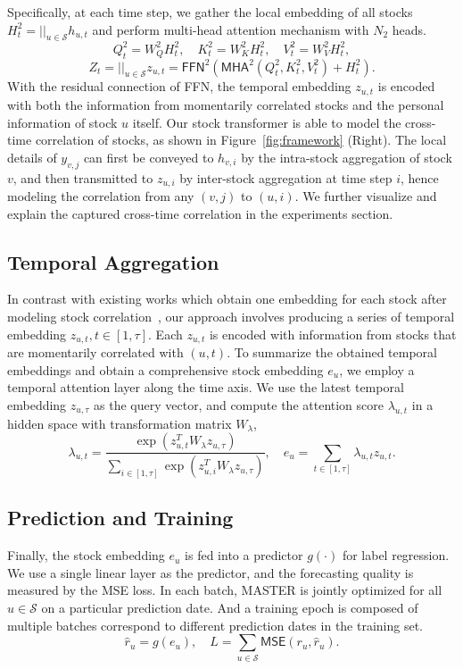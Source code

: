 Specifically, at each time step, we gather the local embedding of all stocks $H^2_t=||_{u\in\mathcal{S}} h_{u,t}$ and perform multi-head attention mechanism with $N_2$ heads. 
$$Q^2_t = W^2_QH^2_t,\quad K^2_t=W^2_KH^2_t, \quad V^2_t=W^2_VH^2_t,$$
$$ Z_t=||_{u\in\mathcal{S}} z_{u,t} =\textsf{FFN}^2(\textsf{MHA}^2(Q^2_t,K^2_t,V^2_t)+H^2_t).$$
With the residual connection of \textsf{FFN}, the temporal embedding $z_{u,t}$ is encoded with both the information from momentarily correlated stocks and the personal information of stock $u$ itself. 
Our stock transformer is able to model the cross-time correlation of stocks, as shown in Figure~\ref{fig:framework} (Right). The local details of $y_{v,j}$ can first be conveyed to $h_{v,i}$ by the intra-stock aggregation of stock $v$, and then transmitted to $z_{u,i}$ by inter-stock aggregation at time step $i$, hence modeling the correlation from any $(v,j)$ to $(u,i)$. 
We further visualize and explain the captured cross-time correlation in the experiments section.

\subsection{Temporal Aggregation}
In contrast with existing works which obtain one embedding for each stock after modeling stock correlation~\cite{feng2019temporal}, our approach involves producing a series of temporal embedding $z_{u,t}, t\in[1,\tau].$ 
Each $z_{u,t}$ is encoded with information from stocks that are momentarily correlated with $(u,t)$.
To summarize the obtained temporal embeddings and obtain a comprehensive stock embedding $e_u$, we employ a temporal attention layer along the time axis. 
We use the latest temporal embedding $z_{u,\tau}$ as the query vector, and compute the attention score $\lambda_{u,t}$ in a hidden space with transformation matrix $W_{\lambda}$,
$$\lambda_{u,t}=\frac{\exp(z^T_{u,t}W_{\lambda}z_{u,\tau})}{\sum_{i\in [1,\tau]} \exp(z^T_{u,i}W_{\lambda}z_{u,\tau})},
\quad e_u=\sum_{t\in[1,\tau]}\lambda_{u,t} z_{u,t}.$$

\subsection{Prediction and Training}
Finally, the stock embedding $e_u$ is fed into a predictor $g(\cdot)$ for label regression. We use a single linear layer as the predictor, and the forecasting quality is measured by the MSE loss. 
In each batch, MASTER is jointly optimized for all $ u\in \mathcal{S}$ on a particular prediction date. And a training epoch is composed of multiple batches correspond to different prediction dates in the training set.
$$\hat{r}_u=g(e_u), \quad L=\sum_{u\in \mathcal{S}}\textsf{MSE}(r_u, \hat{r}_u).$$

